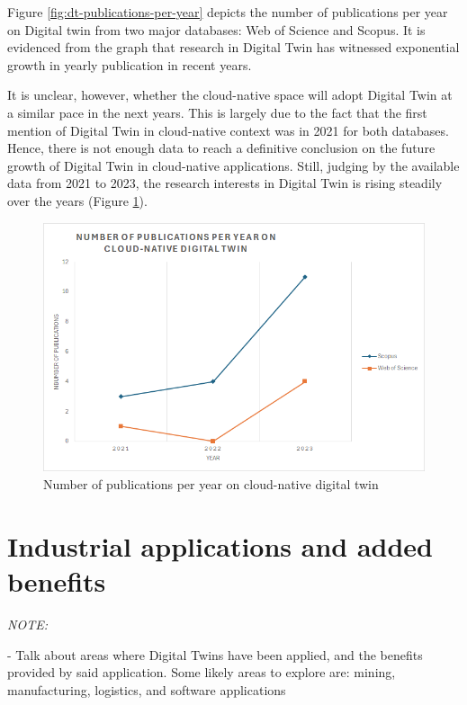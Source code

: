 Figure \ref{fig:dt-publications-per-year} depicts the number of publications per year on Digital twin from two major databases: Web of Science and Scopus. It is evidenced from the graph that research in Digital Twin has witnessed exponential growth in yearly publication in recent years.

It is unclear, however, whether the cloud-native space will adopt Digital Twin at a similar pace in the next years. This is largely due to the fact that the first mention of Digital Twin in cloud-native context was in 2021 for both databases. Hence, there is not enough data to reach a definitive conclusion on the future growth of Digital Twin in cloud-native applications. Still, judging by the available data from 2021 to 2023, the research interests in Digital Twin is rising steadily over the years (Figure \ref{fig:cloud-native-dt-publications}).

\begin{figure}
    \centering
    \includegraphics[width=1\linewidth]{resources/cloud-native-dt-publications.png}
    \caption{Number of publications per year on cloud-native digital twin}
    \label{fig:cloud-native-dt-publications}
\end{figure}

\section{Industrial applications and added benefits}

\textit{NOTE:}

- Talk about areas where Digital Twins have been applied, and the benefits provided by said application. Some likely areas to explore are: mining, manufacturing, logistics, and software applications


